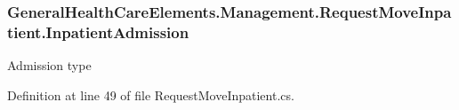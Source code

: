 \subsubsection[{\texorpdfstring{Inpatient\+Admission}{InpatientAdmission}}]{ General\+Health\+Care\+Elements.\+Management.\+Request\+Move\+Inpatient.\+Inpatient\+Admission\hspace{0.3cm}{\ttfamily [get]}}\hypertarget{class_general_health_care_elements_1_1_management_1_1_request_move_inpatient_a479df0ab083ed4a44289c333de8d35e0}{}\label{class_general_health_care_elements_1_1_management_1_1_request_move_inpatient_a479df0ab083ed4a44289c333de8d35e0}


Admission type 



Definition at line 49 of file Request\+Move\+Inpatient.\+cs.

